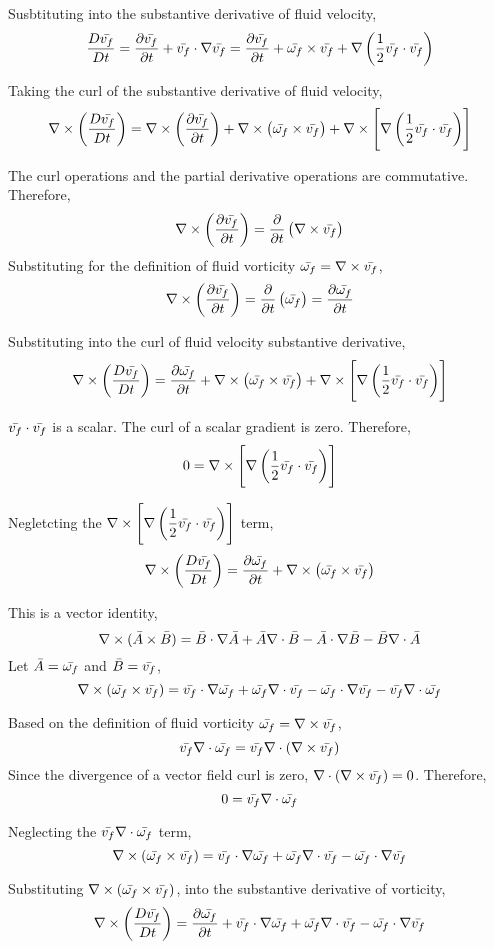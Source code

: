 \documentclass[class=report, 12pt, crop=false]{standalone}
\begin{document}
\begin{center}

Susbtituting into the substantive derivative of fluid velocity,
$$\frac{D \bar{v_f}}{Dt} = \frac{\partial \bar{v_f}}{\partial t} + \bar{v_f}\cdot\nabla\bar{v_f} = \frac{\partial \bar{v_f}}{\partial t} + \bar{\omega_f}\times \bar{v_f} + \nabla\left(\frac{1}{2}\bar{v_f}\cdot\bar{v_f}\right)$$

Taking the curl of the substantive derivative of fluid velocity,
$$\nabla\times\left(\frac{D \bar{v_f}}{Dt}\right) = \nabla\times\left(\frac{\partial \bar{v_f}}{\partial t}\right) + \nabla\times\left(\bar{\omega_f}\times \bar{v_f}\right) + \nabla\times\left[\nabla\left(\frac{1}{2}\bar{v_f}\cdot\bar{v_f}\right)\right]$$

The curl operations and the partial derivative operations are commutative. Therefore,
$$\nabla\times\left(\frac{\partial \bar{v_f}}{\partial t}\right) = \frac{\partial }{\partial t}\left(\nabla\times\bar{v_f}\right)$$
Substituting for the definition of fluid vorticity $\displaystyle \bar{\omega_f} = \nabla\times \bar{v_f}$,
$$\nabla\times\left(\frac{\partial \bar{v_f}}{\partial t}\right) = \frac{\partial }{\partial t}\left(\bar{\omega_f}\right) = \frac{\partial \bar{\omega_f}}{\partial t}$$

Substituting into the curl of fluid velocity substantive derivative,
$$\nabla\times\left(\frac{D \bar{v_f}}{Dt}\right) = \frac{\partial \bar{\omega_f}}{\partial t} + \nabla\times\left(\bar{\omega_f}\times \bar{v_f}\right) + \nabla\times\left[\nabla\left(\frac{1}{2}\bar{v_f}\cdot\bar{v_f}\right)\right]$$

$\bar{v_f}\cdot\bar{v_f}$ is a scalar. The curl of a scalar gradient is zero. Therefore,
$$0 = \nabla\times\left[\nabla\left(\frac{1}{2}\bar{v_f}\cdot\bar{v_f}\right)\right]$$

Negletcting the $\displaystyle \nabla\times\left[\nabla\left(\frac{1}{2}\bar{v_f}\cdot\bar{v_f}\right)\right]$ term,
$$\nabla\times\left(\frac{D \bar{v_f}}{Dt}\right) = \frac{\partial \bar{\omega_f}}{\partial t} + \nabla\times\left(\bar{\omega_f}\times \bar{v_f}\right)$$

This is a vector identity,
$$\nabla\times (\bar{A}\times \bar{B}) = \bar{B}\cdot\nabla \bar{A} + \bar{A}\nabla\cdot \bar{B} - \bar{A}\cdot\nabla \bar{B} - \bar{B}\nabla\cdot \bar{A}$$
Let $\bar{A} = \bar{\omega_f}$ and $\bar{B} = \bar{v_f}$,
$$\nabla\times (\bar{\omega_f}\times \bar{v_f}) = \bar{v_f}\cdot\nabla \bar{\omega_f} + \bar{\omega_f}\nabla\cdot \bar{v_f} - \bar{\omega_f}\cdot\nabla \bar{v_f} - \bar{v_f}\nabla\cdot \bar{\omega_f}$$

Based on the definition of fluid vorticity $\bar{\omega_f} = \nabla\times\bar{v_f}$,
$$\bar{v_f}\nabla\cdot \bar{\omega_f} = \bar{v_f}\nabla\cdot (\nabla\times\bar{v_f})$$
Since the divergence of a vector field curl is zero, $\displaystyle \nabla\cdot (\nabla\times\bar{v_f})=0$. Therefore,
$$0 = \bar{v_f}\nabla\cdot \bar{\omega_f}$$

Neglecting the $\displaystyle \bar{v_f}\nabla\cdot \bar{\omega_f}$ term,
$$\nabla\times (\bar{\omega_f}\times \bar{v_f}) = \bar{v_f}\cdot\nabla \bar{\omega_f} + \bar{\omega_f}\nabla\cdot \bar{v_f} - \bar{\omega_f}\cdot\nabla \bar{v_f}$$


Substituting $\displaystyle \nabla\times (\bar{\omega_f}\times \bar{v_f})$, into the substantive derivative of vorticity,
$$\nabla\times\left(\frac{D \bar{v_f}}{Dt}\right) = \frac{\partial \bar{\omega_f}}{\partial t} + \bar{v_f}\cdot\nabla \bar{\omega_f} + \bar{\omega_f}\nabla\cdot \bar{v_f} - \bar{\omega_f}\cdot\nabla \bar{v_f}$$



\end{center}
\end{document}
